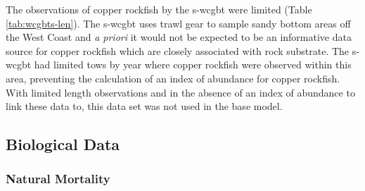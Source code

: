 \documentclass[11pt,
  english,
  a4paper,
]{article}
\begin{document}
\leavevmode\tagmcend\tagstructend\par


The observations of copper rockfish by the \gls{s-wcgbt} were limited (Table \ref{tab:wcgbts-len}). The \gls{s-wcgbt} uses trawl gear to sample sandy bottom areas off the West Coast and \emph{a priori} it would not be expected to be an informative data source for copper rockfish which are closely associated with rock substrate. The \gls{s-wcgbt} had limited tows by year where copper rockfish were observed within this area, preventing the calculation of an index of abundance for copper rockfish. With limited length observations and in the absence of an index of abundance to link these data to, this data set was not used in the base model.

\leavevmode\tagmcend\tagstructend\par


\hypertarget{bio-data}{%
\subsection{Biological Data}\label{bio-data}}

\leavevmode\tagmcend\tagstructend


\hypertarget{natural-mortality}{%
\subsubsection{Natural Mortality}\label{natural-mortality}}

\leavevmode\tagmcend\tagstructend

\end{document}
